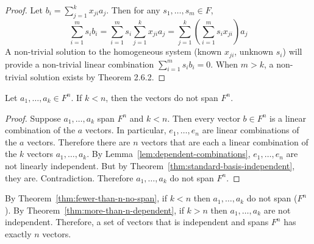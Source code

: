 \begin{proof}
    Let $b_i = \sum_{j=1}^{k} x_{ji} a_j$. Then for any $s_1, \ldots, s_m \in F$,
    \[
    \sum_{i=1}^{m} s_i b_i = \sum_{i=1}^{m} s_i \sum_{j=1}^{k} x_{ji} a_j = \sum_{j=1}^{k} \left(\sum_{i=1}^{m} s_i x_{ji}\right) a_j
    \]
    A non-trivial solution to the homogeneous system (known $x_{ji}$, unknown $s_i$)
    will provide a non-trivial linear combination $\sum_{i=1}^{m} s_i b_i = 0$. When $m > k$, a non-trivial solution exists by Theorem 2.6.2.
\end{proof}

\begin{theorem}\label{thm:fewer-than-n-no-span}
    Let $a_1, \ldots, a_k \in F^n$. If $k < n$, then the vectors do not span $F^n$.
\end{theorem}

\begin{proof}
    Suppose $a_1, \ldots, a_k$ span $F^n$ and $k < n$. Then every vector $b \in F^n$ is a linear combination of the $a$ vectors. In particular, $e_1, \ldots, e_n$ are linear combinations of the $a$ vectors. Therefore there are $n$ vectors that are each a linear combination of the $k$ vectors $a_1, \ldots, a_k$. By Lemma~\ref{lem:dependent-combinations}, $e_1, \ldots, e_n$ are not linearly independent. But by Theorem~\ref{thm:standard-basis-independent}, they are. Contradiction. Therefore $a_1, \ldots, a_k$ do not span $F^n$.
\end{proof}

\begin{conclusion*}
    By Theorem~\ref{thm:fewer-than-n-no-span}, if $k < n$ then $a_1, \ldots, a_k$ do not span ($F^n$). By Theorem~\ref{thm:more-than-n-dependent}, if $k > n$ then $a_1, \ldots, a_k$ are not independent. Therefore, a set of vectors that is independent and spans $F^n$ has exactly $n$ vectors.
\end{conclusion*}